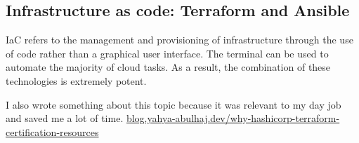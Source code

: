 \subsection{Infrastructure as code: Terraform and Ansible}

IaC refers to the management and provisioning of infrastructure through the use of code rather than a graphical user interface. The terminal can be used to automate the majority of cloud tasks. As a result, the combination of these technologies is extremely potent.\newline

I also wrote something about this topic because it was relevant to my day job and saved me a lot of time. \href{https://blog.yahya-abulhaj.dev/why-hashicorp-terraform-certification-resources}{blog.yahya-abulhaj.dev/why-hashicorp-terraform-certification-resources
} 
